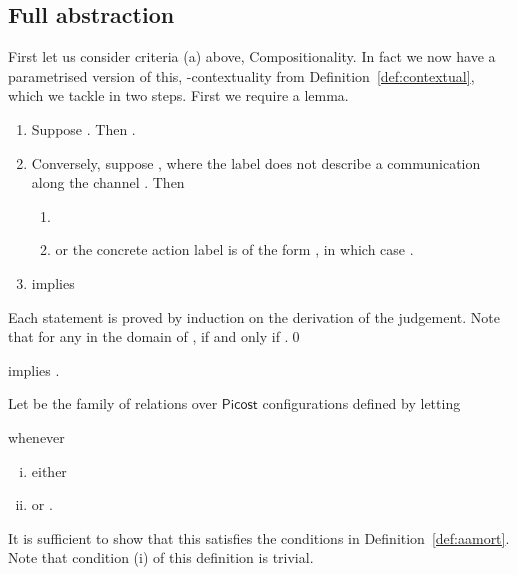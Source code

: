 \documentclass{LMCS}
\newcommand{\pfn}[1]{\mathsf{#1}}  \newcommand{\cfn}[1]{\mathsf{#1}}  \newcommand{\ownfnt}[1]{{\mathsf{#1}}}
\newcommand{\picost}{\ensuremath{\pfn{Picost}}\xspace}
\newcommand{\leaveout}[1]{ }
\begin{document}
\leaveout{
Before embarking on the proof of Theorem~\ref{thm:fa} we should point out that it has
Proposition~\ref{prop:own1} 
as a direct corollary. For example, using the notation of that proposition, it is simple to
prove that 

if and only if

because every -action is a -action and vice-versa. 
Similar reasoning gives Theorem~\ref{thm:externalfa} as a corollary.
}

\subsection{Full abstraction}\label{sec:fa}

First let us consider criteria (a) above, Compositionality.  
In fact we now  have a parametrised version of this, -contextuality from
Definition~\ref{def:contextual}, which we tackle  in two steps.
First we require a lemma. 
\begin{lem}\label{lem:env.extend}\qquad
  \begin{enumerate}[\em(i)]
  \item   Suppose . Then 
  .

 \item Conversely, suppose ,
       where the label  does not describe a communication along the channel . 
       Then 
       \begin{enumerate}[\em(a)]
       \item 
       \item or the concrete action label  is of the form , in which case
        .
       \end{enumerate}
  \item 
   implies 


  \end{enumerate}
\end{lem}
\proof
   Each statement is  proved by induction on the derivation of the judgement. 
Note that for any  in the domain of , 
 if and only if 
 .\qed

\begin{prop}[-contextual]\label{prop:a.extend}
   implies .
\end{prop}
\proof
  Let  be the family of relations over \picost configurations
defined by letting
  
whenever  
\begin{enumerate}[(i)]
\item either 

\item or .
\end{enumerate}
It is sufficient to show that this satisfies the conditions in
Definition~\ref{def:aamort}. Note that condition (i) of this
definition is trivial.
\end{document}
